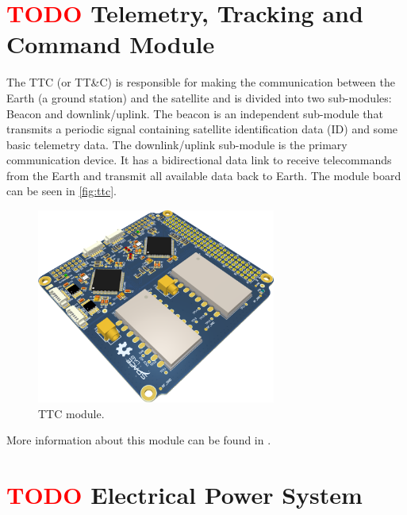 \section{ \textcolor{red}{TODO} Telemetry, Tracking and Command Module}

The TTC (or TT\&C) is responsible for making the communication between the Earth (a ground station) and the satellite and is divided into two sub-modules: Beacon and downlink/uplink. The beacon is an independent sub-module that transmits a periodic signal containing satellite identification data (ID) and some basic telemetry data. The downlink/uplink sub-module is the primary communication device. It has a bidirectional data link to receive telecommands from the Earth and transmit all available data back to Earth. The module board can be seen in \autoref{fig:ttc}.

\begin{figure}[!ht]
    \begin{center}
        \includegraphics[width=0.7\textwidth]{figures/subsystems/ttc2_pcb_3d}
        \caption{TTC module.}
        \label{fig:ttc}
    \end{center}
\end{figure}

More information about this module can be found in \cite{ttc}.


\section{ \textcolor{red}{TODO} Electrical Power System}

